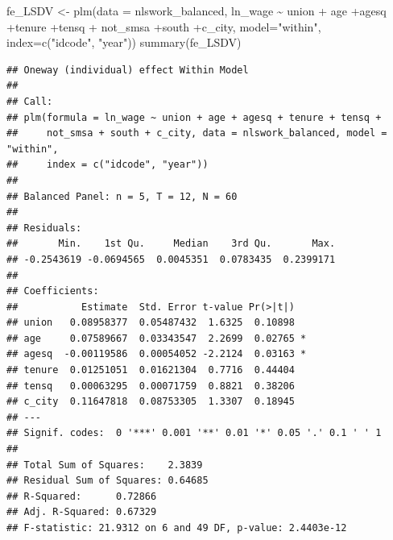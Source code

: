\documentclass[
]{article}
\newenvironment{Shaded}{\begin{snugshade}}{\end{snugshade}}
\newcommand{\AttributeTok}[1]{\textcolor[rgb]{0.77,0.63,0.00}{#1}}
\newcommand{\FunctionTok}[1]{\textcolor[rgb]{0.00,0.00,0.00}{#1}}
\newcommand{\NormalTok}[1]{#1}
\newcommand{\OtherTok}[1]{\textcolor[rgb]{0.56,0.35,0.01}{#1}}
\newcommand{\SpecialCharTok}[1]{\textcolor[rgb]{0.00,0.00,0.00}{#1}}
\newcommand{\StringTok}[1]{\textcolor[rgb]{0.31,0.60,0.02}{#1}}
\begin{document}
\begin{Shaded}
\begin{Highlighting}[]
\NormalTok{  fe\_LSDV }\OtherTok{\textless{}{-}} \FunctionTok{plm}\NormalTok{(}\AttributeTok{data =}\NormalTok{ nlswork\_balanced, ln\_wage }\SpecialCharTok{\textasciitilde{}}\NormalTok{ union }\SpecialCharTok{+}
\NormalTok{              age }\SpecialCharTok{+}\NormalTok{agesq }\SpecialCharTok{+}\NormalTok{tenure }\SpecialCharTok{+}\NormalTok{tensq }\SpecialCharTok{+}
\NormalTok{              not\_smsa }\SpecialCharTok{+}\NormalTok{south }\SpecialCharTok{+}\NormalTok{c\_city, }\AttributeTok{model=}\StringTok{"within"}\NormalTok{, }\AttributeTok{index=}\FunctionTok{c}\NormalTok{(}\StringTok{"idcode"}\NormalTok{, }\StringTok{"year"}\NormalTok{))}
  \FunctionTok{summary}\NormalTok{(fe\_LSDV)}
\end{Highlighting}
\end{Shaded}

\begin{verbatim}
## Oneway (individual) effect Within Model
## 
## Call:
## plm(formula = ln_wage ~ union + age + agesq + tenure + tensq + 
##     not_smsa + south + c_city, data = nlswork_balanced, model = "within", 
##     index = c("idcode", "year"))
## 
## Balanced Panel: n = 5, T = 12, N = 60
## 
## Residuals:
##       Min.    1st Qu.     Median    3rd Qu.       Max. 
## -0.2543619 -0.0694565  0.0045351  0.0783435  0.2399171 
## 
## Coefficients:
##           Estimate  Std. Error t-value Pr(>|t|)  
## union   0.08958377  0.05487432  1.6325  0.10898  
## age     0.07589667  0.03343547  2.2699  0.02765 *
## agesq  -0.00119586  0.00054052 -2.2124  0.03163 *
## tenure  0.01251051  0.01621304  0.7716  0.44404  
## tensq   0.00063295  0.00071759  0.8821  0.38206  
## c_city  0.11647818  0.08753305  1.3307  0.18945  
## ---
## Signif. codes:  0 '***' 0.001 '**' 0.01 '*' 0.05 '.' 0.1 ' ' 1
## 
## Total Sum of Squares:    2.3839
## Residual Sum of Squares: 0.64685
## R-Squared:      0.72866
## Adj. R-Squared: 0.67329
## F-statistic: 21.9312 on 6 and 49 DF, p-value: 2.4403e-12
\end{verbatim}
\end{document}
